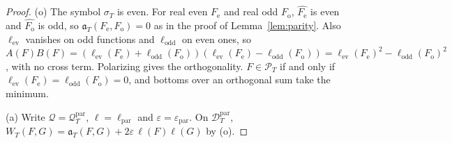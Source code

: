 \documentclass[11pt]{amsart}
\theoremstyle{definition}
\theoremstyle{remark}
\newcommand{\PT}{\mathcal P_T}
\newcommand{\sT}{\sigma_T}
\begin{document}
\begin{proof}
(o) The symbol $\sT$ is even. For real even $F_{\mathrm e}$ and real odd $F_{\mathrm o}$, $\widehat{F_{\mathrm e}}$ is even and
$\widehat{F_{\mathrm o}}$ is odd, so $\mathfrak a_T(F_{\mathrm e},F_{\mathrm o})=0$ as in the proof of
Lemma~\ref{lem:parity}. Also $\ell_{\mathrm{ev}}$ vanishes on odd functions and $\ell_{\mathrm{odd}}$ on even ones, so
$A(F)B(F)=(\ell_{\mathrm{ev}}(F_{\mathrm e})+\ell_{\mathrm{odd}}(F_{\mathrm o}))(\ell_{\mathrm{ev}}(F_{\mathrm e})-\ell_{\mathrm{odd}}(F_{\mathrm o}))
=\ell_{\mathrm{ev}}(F_{\mathrm e})^2-\ell_{\mathrm{odd}}(F_{\mathrm o})^2$, with no cross term. Polarizing gives the
orthogonality. $F\in\PT$ if and only if $\ell_{\mathrm{ev}}(F_{\mathrm e})=\ell_{\mathrm{odd}}(F_{\mathrm o})=0$, and bottoms over an
orthogonal sum take the minimum.

(a) Write $\mathcal Q=\mathcal Q^{\mathrm{par}}_T$, $\ell=\ell_{\mathrm{par}}$ and $\varepsilon=\varepsilon_{\mathrm{par}}$. On
$\mathcal D^{\mathrm{par}}_T$, $W_T(F,G)=\mathfrak a_T(F,G)+2\varepsilon\,\ell(F)\ell(G)$ by (o).


\end{proof}
\end{document}
